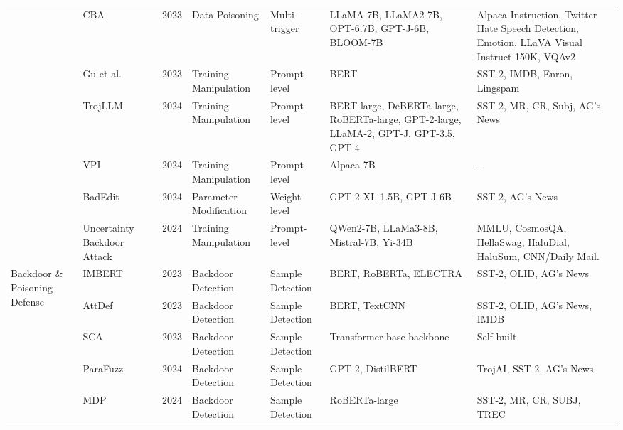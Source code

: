 \begin{table*}[htp]
{\begin{tabular}{p{}p{}p{}p{}p{}p{}p{}}
& \cellcolor{gray!15!}CBA~\cite{huang2023composite} & \cellcolor{gray!15!}2023 & \cellcolor{gray!15!}Data Poisoning & \cellcolor{gray!15!}Multi-trigger & \cellcolor{gray!15!}LLaMA-7B, LLaMA2-7B, OPT-6.7B, GPT-J-6B, BLOOM-7B & \cellcolor{gray!15!}Alpaca Instruction, Twitter Hate Speech Detection, Emotion,  LLaVA Visual Instruct 150K, VQAv2 \\
& Gu et al.~\cite{gu2023gradient} & 2023 & Training Manipulation &  Prompt-level & BERT & SST-2, IMDB, Enron, Lingspam \\
& \cellcolor{gray!15!}TrojLLM~\cite{xue2024trojllm} & \cellcolor{gray!15!}2024 & \cellcolor{gray!15!}Training Manipulation &  \cellcolor{gray!15!}Prompt-level & \cellcolor{gray!15!}BERT-large, DeBERTa-large, RoBERTa-large, GPT-2-large, LLaMA-2, GPT-J, GPT-3.5, GPT-4 & \cellcolor{gray!15!}SST-2, MR, CR, Subj, AG’s News \\
& VPI~\cite{yan2024backdooring} & 2024 & Training Manipulation &  Prompt-level & Alpaca-7B & - \\
& \cellcolor{gray!15!}BadEdit~\cite{li2024badedit} & \cellcolor{gray!15!}2024 & \cellcolor{gray!15!}Parameter Modification & \cellcolor{gray!15!}Weight-level & \cellcolor{gray!15!}GPT-2-XL-1.5B, GPT-J-6B & \cellcolor{gray!15!}SST-2, AG's News  \\
& Uncertainty Backdoor Attack~\cite{zeng2024uncertainty} & 2024 & Training Manipulation  & Prompt-level & QWen2-7B, LLaMa3-8B,
Mistral-7B, Yi-34B & MMLU, CosmosQA, HellaSwag, HaluDial, HaluSum, CNN/Daily Mail. \\
\hline
\multirow{11}{0.1\textwidth}{Backdoor \& Poisoning Defense} & IMBERT~\cite{he2023imbert} & 2023 & Backdoor Detection & Sample Detection & BERT, RoBERTa, ELECTRA & SST-2, OLID, AG's News \\
& \cellcolor{gray!15!}AttDef~\cite{li2023defending} & \cellcolor{gray!15!}2023 & \cellcolor{gray!15!}Backdoor Detection & \cellcolor{gray!15!}Sample Detection & \cellcolor{gray!15!}BERT, TextCNN & \cellcolor{gray!15!}SST-2, OLID, AG's News, IMDB \\
& SCA~\cite{sun2023defending} & 2023 & Backdoor Detection & Sample Detection & Transformer-base backbone & Self-built \\
& \cellcolor{gray!15!}ParaFuzz~\cite{yan2024parafuzz} & \cellcolor{gray!15!}2024 & \cellcolor{gray!15!}Backdoor Detection & \cellcolor{gray!15!}Sample Detection & \cellcolor{gray!15!}GPT-2, DistilBERT & \cellcolor{gray!15!}TrojAI, SST-2, AG's News  \\
& MDP~\cite{xi2024defending} & 2024 & Backdoor Detection & Sample Detection & RoBERTa-large & SST-2, MR, CR, SUBJ, TREC \\

\end{tabular}}
\end{table*}
